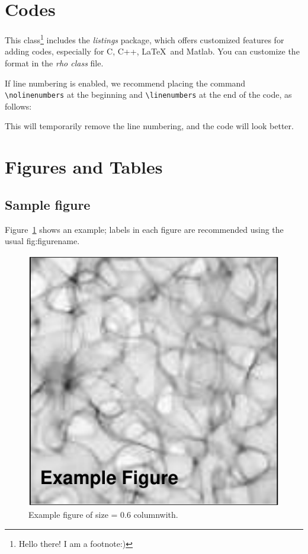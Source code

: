 \documentclass[10pt,letter,twoside]{rmaa-rho-class/rmac-rho}
\begin{document}
\section{Codes}

    This class\footnote{Hello there! I am a footnote:)} includes the \textit{listings} package, which offers customized features for adding codes, especially for C, C++, \LaTeX\ and Matlab. You can customize the format in the \textit{rho class} file.

%    
    
    If line numbering is enabled, we recommend placing the command \verb|\nolinenumbers| at the beginning and \verb|\linenumbers| at the end of the code, as follows: 
    
    This will temporarily remove the line numbering, and the code will look better.
    


\section{Figures and Tables}

    \subsection{Sample figure}

        Figure~\ref{fig:figure} shows an example; labels in each figure are recommended using the usual fig:figurename.
        
            \begin{figure}[ht]
                \centering
                \includegraphics[width=0.6\columnwidth]{figures/example-fig.pdf}
                \caption{Example figure of size = 0.6 columnwith.}
                \label{fig:figure}
            \end{figure}
\end{document}
